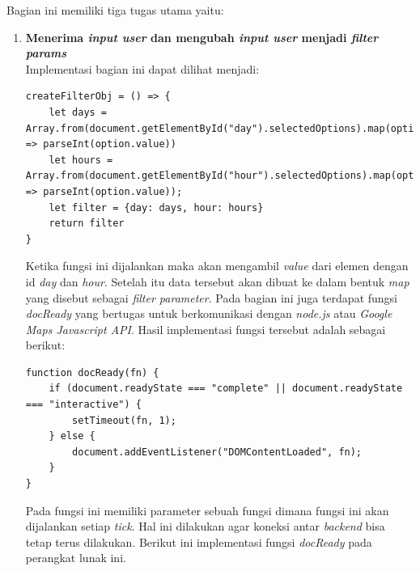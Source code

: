 

Bagian ini memiliki tiga tugas utama yaitu:
\begin{enumerate}
    \item \textbf{Menerima \textit{input user} dan mengubah \textit{input user} menjadi \textit{filter params}} \\
Implementasi bagian ini dapat dilihat menjadi:
\begin{lstlisting}[label=input_user , caption=Input User]
createFilterObj = () => {
    let days = Array.from(document.getElementById("day").selectedOptions).map(option => parseInt(option.value))
    let hours = Array.from(document.getElementById("hour").selectedOptions).map(option => parseInt(option.value));
    let filter = {day: days, hour: hours}
    return filter
}

\end{lstlisting}

Ketika fungsi ini dijalankan maka akan mengambil \textit{value} dari elemen dengan id \textit{day} dan \textit{hour}. Setelah itu data tersebut akan dibuat ke dalam bentuk \textit{map} yang disebut sebagai \textit{filter parameter}. Pada bagian ini juga terdapat fungsi \textit{docReady} yang bertugas untuk  berkomunikasi dengan \textit{node.js} atau \textit{Google Maps Javascript API}. Hasil implementasi fungsi tersebut adalah sebagai berikut:
\begin{lstlisting}[label=docReady , caption=docReady Method]
function docReady(fn) {
    if (document.readyState === "complete" || document.readyState === "interactive") {
        setTimeout(fn, 1);
    } else {
        document.addEventListener("DOMContentLoaded", fn);
    }
}

\end{lstlisting}
Pada fungsi ini memiliki parameter sebuah fungsi dimana fungsi ini akan dijalankan setiap \textit{tick}. Hal ini dilakukan agar koneksi antar \textit{backend} bisa tetap terus dilakukan. Berikut ini implementasi fungsi \textit{docReady} pada perangkat lunak ini.


\end{enumerate}
